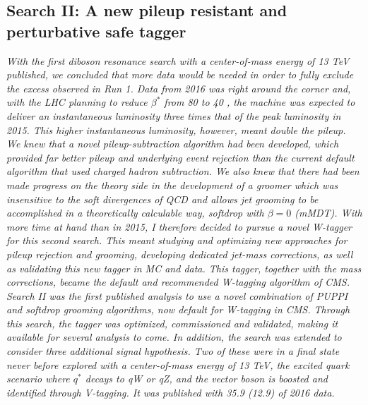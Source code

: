 \vspace*{\fill}
\begin{centering}
\chapter{Search II: A new pileup resistant and perturbative safe tagger}
\label{searchII}
\textit{
\noindent With the first diboson resonance search with a center-of-mass energy of 13 TeV published, we concluded that more data would be needed in order to fully exclude the excess observed in Run 1. Data from 2016 was right around the corner and, with the LHC planning to reduce $\beta^*$ from 80 to 40 \cm, the machine was expected to deliver an instantaneous luminosity three times that of the peak luminosity in 2015. This higher instantaneous luminosity, however, meant double the pileup.
\newline
\newline
We knew that a novel pileup-subtraction algorithm had been developed, which provided far better pileup and underlying event rejection than the current default algorithm that used charged hadron subtraction. We also knew that there had been made progress on the theory side in the development of a groomer which was insensitive to the soft divergences of QCD and allows jet grooming to be accomplished in a theoretically calculable way, softdrop with $\beta = 0$ (mMDT).
\newline
\newline
With more time at hand than in 2015, I therefore decided to pursue a novel W-tagger for this second search. This meant studying and optimizing new approaches for pileup rejection and grooming, developing dedicated jet-mass corrections, as well as validating this new tagger in MC and data. This tagger, together with the mass corrections, became the default and recommended W-tagging algorithm of CMS.
\newline
\newline
Search II was the first published analysis to use a novel combination of PUPPI and softdrop grooming algorithms, now default for W-tagging in CMS. Through this search, the tagger was optimized, commissioned and validated, making it available for several analysis to come. In addition, the search was extended to consider three additional signal hypothesis. Two of these were in a final state never before explored with a center-of-mass energy of 13 TeV, the excited quark scenario where $q^*$ decays to qW or qZ, and the vector boson is boosted and identified through V-tagging. It was published with 35.9 (12.9) \fbinv of 2016 data.
}
\end{centering}
